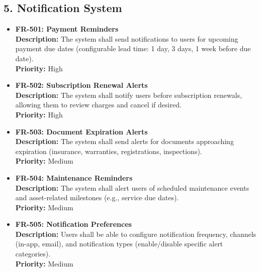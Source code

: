 \documentclass[11pt, a4paper]{article}
\newcommand{\reqid}[1]{\textbf{\color{PrimaryColor}#1}}
\begin{document}
	\subsection{5. Notification System}
	\begin{itemize}
		\item \reqid{FR-501: Payment Reminders} \\
		\textbf{Description:} The system shall send notifications to users for upcoming payment due dates (configurable lead time: 1 day, 3 days, 1 week before due date). \\
		\textbf{Priority:} High
		
		\item \reqid{FR-502: Subscription Renewal Alerts} \\
		\textbf{Description:} The system shall notify users before subscription renewals, allowing them to review charges and cancel if desired. \\
		\textbf{Priority:} High
		
		\item \reqid{FR-503: Document Expiration Alerts} \\
		\textbf{Description:} The system shall send alerts for documents approaching expiration (insurance, warranties, registrations, inspections). \\
		\textbf{Priority:} Medium
		
		\item \reqid{FR-504: Maintenance Reminders} \\
		\textbf{Description:} The system shall alert users of scheduled maintenance events and asset-related milestones (e.g., service due dates). \\
		\textbf{Priority:} Medium
		
		\item \reqid{FR-505: Notification Preferences} \\
		\textbf{Description:} Users shall be able to configure notification frequency, channels (in-app, email), and notification types (enable/disable specific alert categories). \\
		\textbf{Priority:} Medium
	\end{itemize}
	
\end{document}
